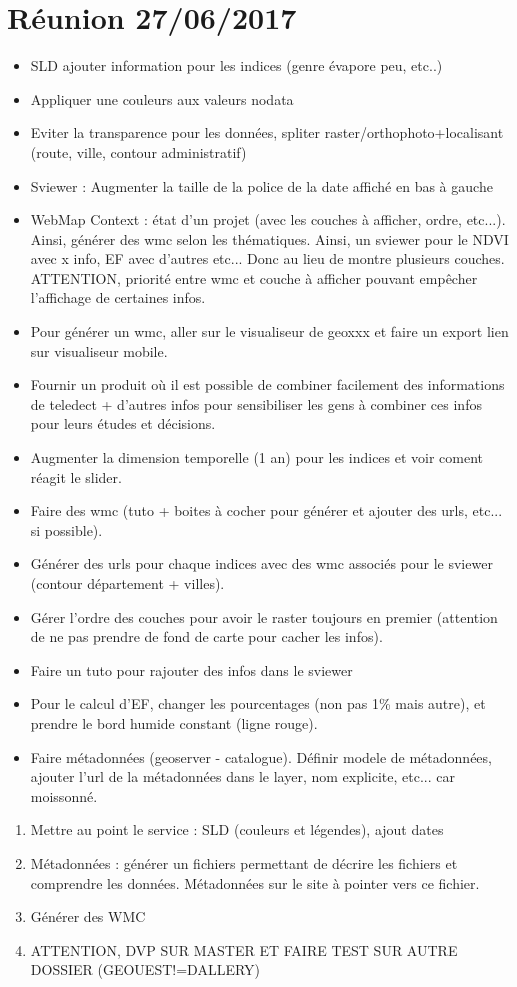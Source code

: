 \documentclass[10pt,a4paper]{article}
\begin{document}
\section{Réunion 27/06/2017}
\begin{itemize}
\item SLD ajouter information pour les indices (genre évapore peu, etc..)
\item Appliquer une couleurs aux valeurs nodata
\item Eviter la transparence pour les données, spliter raster/orthophoto+localisant (route, ville, contour administratif)
\item Sviewer : Augmenter la taille de la police de la date affiché en bas à gauche
\item WebMap Context : état d'un projet (avec les couches à afficher, ordre, etc...). Ainsi, générer des wmc selon les thématiques. Ainsi, un sviewer pour le NDVI avec x info, EF avec d'autres etc... Donc au lieu de montre plusieurs couches. ATTENTION, priorité entre wmc et couche à afficher pouvant empêcher l'affichage de certaines infos.
\item Pour générer un wmc, aller sur le visualiseur de geoxxx et faire un export lien sur visualiseur mobile.
\item Fournir un produit où il est possible de combiner facilement des informations de teledect + d'autres infos pour sensibiliser les gens à combiner ces infos pour leurs études et décisions.
\end{itemize}
\begin{itemize}
\item Augmenter la dimension temporelle (1 an) pour les indices et voir coment réagit le slider.
\item Faire des wmc (tuto + boites à cocher pour générer et ajouter des urls, etc... si possible).
\item Générer des urls pour chaque indices avec des wmc associés pour le sviewer (contour département + villes).
\item Gérer l'ordre des couches pour avoir le raster toujours en premier (attention de ne pas prendre de fond de carte pour cacher les infos).
\item Faire un tuto pour rajouter des infos dans le sviewer 
\item Pour le calcul d'EF, changer les pourcentages (non pas 1\% mais autre), et prendre le bord humide constant (ligne rouge).
\item Faire métadonnées (geoserver - catalogue). Définir modele de métadonnées, ajouter l'url de la métadonnées dans le layer, nom explicite, etc... car moissonné.
\end{itemize}
\begin{enumerate}
\item Mettre au point le service : SLD (couleurs et légendes), ajout dates
\item Métadonnées : générer un fichiers permettant de décrire les fichiers et comprendre les données. Métadonnées sur le site à pointer vers ce fichier.
\item Générer des WMC
\item ATTENTION, DVP SUR MASTER ET FAIRE TEST SUR AUTRE DOSSIER (GEOUEST!=DALLERY)
\end{enumerate}
\end{document}
